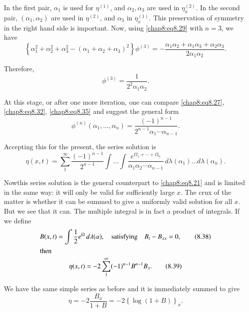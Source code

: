 In the first pair, $\alpha_1$ is used for $\eta^{(1)}$, and $\alpha_2,\alpha_3$ are used in $\eta_x^{(2)}$. In the second pair, $(\alpha_1,\alpha_2)$ are used in $\eta^{(2)}$, and $\alpha_3$ in $\eta_x^{(1)}$. This preservation of symmetry in the right hand side is important. Now, using \eqref{chap8:eq8.29} with $n=3$, we have 
\begin{equation}
\left\{\alpha_1^2+\alpha_2^2+\alpha_3^2-\left(\alpha_1+\alpha_2+\alpha_3\right)^2 \right\}\phi^{(3)}=- \frac{\alpha_1\alpha_2+\alpha_1\alpha_3+\alpha_2\alpha_3} {2\alpha_1\alpha_2}.\tag{8.34}\label{chap8:eq8.34}
\end{equation}

Therefore,
\begin{equation}
\phi^{(3)}=\frac{1}{2^2\alpha_1\alpha_2}.\tag{8.35}\label{chap8:eq8.35}
\end{equation}

At this stage, or after one more iteration, one can compare \eqref{chap8:eq8.27}, \eqref{chap8:eq8.32}, \eqref{chap8:eq8.35} and suggest the general form 
\begin{equation}
\phi^{(n)}\left(\alpha_1,\ldots,\alpha_n\right)= \frac{(-1)^{n-1}} {2^{n-1}\alpha_1 \cdots\alpha_{n-1}}.\tag{8.36}\label{chap8:eq8.36}
\end{equation}

Accepting this for the present, the series solution is 
\begin{equation}
\eta(x,t)=\sum\limits_1^\infty\frac{(-1)^{n-1}}{2^{n-1}}\int\ldots\int \frac{e^{\Omega_1+\cdots+\Omega_n}}{\alpha_1\alpha_2\cdots\alpha_{n-1}}\,d\lambda (\alpha_1)\ldots d\lambda(\alpha_n).\tag{8.37}\label{chap8:eq8.37}
\end{equation}

Now\pageoriginale this series solution is the general counterpart to \eqref{chap8:eq8.21} and is limited in the same way: it will only be valid for sufficiently large $x$. The crux of the matter is whether it can be summed to give a uniformly valid solution for all $x$. But we see that it can. The multiple integral is in fact a product of integrals. If we define 
\begin{gather}
B(x,t)=\int\frac{1}{2}e^\Omega\,d\lambda(\alpha),\quad\text{satisfying}\quad B_t-B_{xx}=0,\tag{8.38}\label{chap8:eq8.38}\\
\intertext{then}
\eta(x,t)=-2\sum\limits_1^\infty(-1)^{n-1}B^{n-1}B_x. \tag{8.39}\label{chap8:eq8.39}
\end{gather}

We have the same simple series as before and it is immediately summed to give
\begin{equation}
\eta=-2\frac{B_x}{1+B}=-2\left\{\log(1+B)\right\}_x. \tag{8.40}\label{chap8:eq8.40}
\end{equation}


